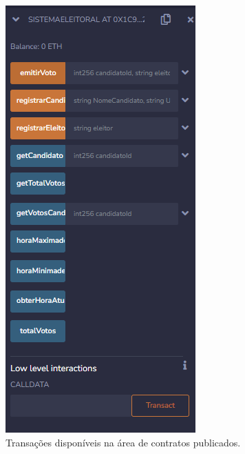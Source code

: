 \documentclass[portuguese]{textolivre}
\begin{document}
	
	\begin{figure}[htbp]
		\centering
		\begin{minipage}{.5\textwidth}
			\includegraphics[width=\textwidth]{fig-005.png} %
			\caption{Transações disponíveis na área de contratos publicados.}
			\label{contratos}
		\end{minipage}
	\end{figure}
	
\end{document}
